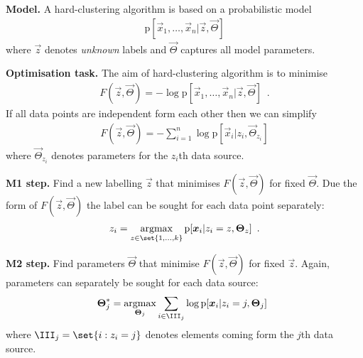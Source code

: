 \documentclass[landscape,footrule]{foils}
\newcommand{\pd}[1]{\mathrm{p}[#1]}
\DeclareMathOperator*{\argmax}{argmax}
\begin{document}
\titlefoil



\textbf{Model.}
A hard-clustering algorithm is based on a probabilistic model
\begin{align*}
\pd{\vec{x}_1,\ldots,\vec{x}_n|\vec{z},\vec{\Theta}}
\end{align*}
where $\vec{z}$ denotes \emph{unknown} labels  and $\vec{\Theta}$ captures all model parameters. 

\textbf{Optimisation task.} The aim of hard-clustering algorithm is to minimise 
\begin{align*}
F(\vec{z},\vec{\Theta})=-\log \pd{\vec{x}_1,\ldots,\vec{x}_n|\vec{z},\vec{\Theta}}\enspace.
\end{align*}
If all data points are independent form each other then we can  simplify
\begin{align*}
F(\vec{z},\vec{\Theta}) =- \sum_{i=1}^n \log\pd{\vec{x}_i|z_i,\vec{\Theta}_{z_i}}
\end{align*}
where $\vec{\Theta}_{z_i}$ denotes parameters for the $z_i$th data source.\vspace*{-0.5cm}





\textbf{M1 step.} Find a new labelling $\vec{z}$ that minimises $F(\vec{z},\vec{\Theta})$ for fixed $\vec{\Theta}$. Due the form of $F(\vec{z},\vec{\Theta})$ the label can be sought for each data point separately:
\begin{align*}
 z_i=\argmax_{z\in\set{1,\ldots,k}} \pd{\vec{x}_i|z_i=z,\vec{\Theta}_{z}}\enspace.
\end{align*}


\textbf{M2 step.} Find parameters $\vec{\Theta}$ that minimise $F(\vec{z},\vec{\Theta})$ for fixed $\vec{z}$. Again, parameters can separately be sought for each data source:
\begin{align*}
 \vec{\Theta}_j^*=\argmax_{\vec{\Theta}_j} \sum_{i\in\III_j}\log \pd{\vec{x}_i|z_i=j,\vec{\Theta}_{j}}\enspace
\end{align*}
where $\III_j=\set{i: z_i=j}$ denotes elements coming form the $j$th data source.
\end{document}
